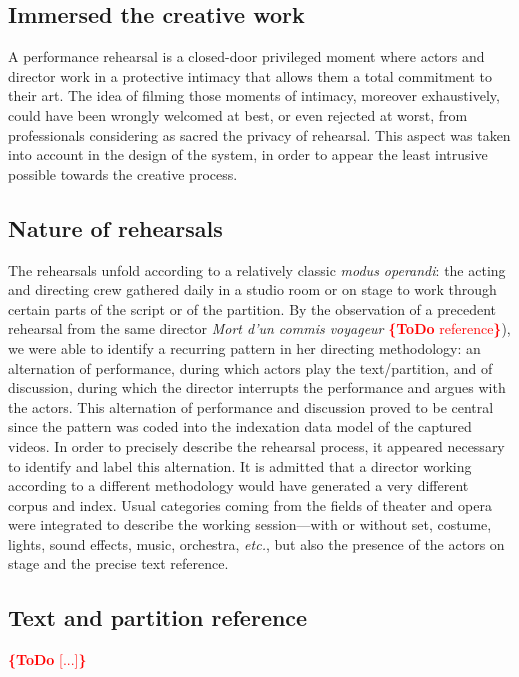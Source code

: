 \documentclass[conference]{IEEEtran}
\newcommand{\todo}[1]{\noindent\textcolor{red}{{\bf \{ToDo} #1{\bf \}}}}
\begin{document}
\subsection{Immersed the creative work}

A performance rehearsal is a closed-door privileged moment where actors and director work in a protective intimacy that allows them a total commitment to their art. The idea of filming those moments of intimacy, moreover exhaustively, could have been wrongly welcomed at best, or even rejected at worst, from professionals considering as sacred the privacy of rehearsal.
This aspect was taken into account in the design of the system, in order to appear the least intrusive possible towards the creative process.

\subsection{Nature of rehearsals}

The rehearsals unfold according to a relatively classic \emph{modus operandi}: the acting and directing crew gathered daily in a studio room or on stage to work through certain parts of the script or of the partition. By the observation of a precedent rehearsal from the same director \emph{Mort d'un commis voyageur} \todo{reference}), we were able to identify a recurring pattern in her directing methodology: an alternation of performance, during which actors play the text/partition, and of discussion, during which the director interrupts the performance and argues with the actors. This alternation of performance and discussion proved to be central since the pattern was coded into the indexation data model of the captured videos.
In order to precisely describe the rehearsal process, it appeared necessary to identify and label this alternation.
It is admitted that a director working according to a different methodology would have generated a very different corpus and index.
Usual categories coming from the fields of theater and opera were integrated to describe the working session---with or without set, costume, lights, sound effects, music, orchestra, \emph{etc.}, but also the presence of the actors on stage and the precise text reference.

\subsection{Text and partition reference}

\todo{[...]}
\end{document}
